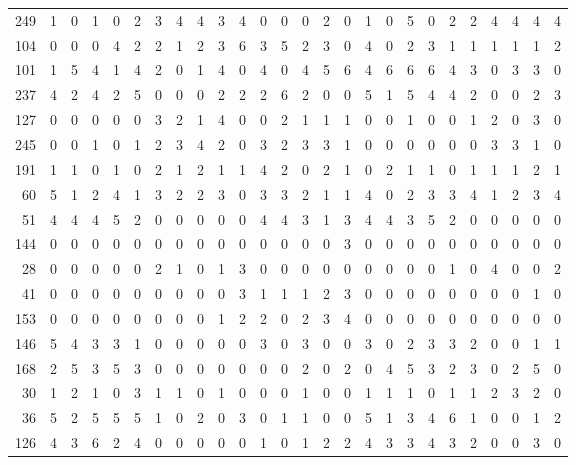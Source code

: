 \begin{longtable}{@{\extracolsep{\fill}}rccccccccccccccccccccccccc@{}}
249 & 1 & 0 & 1 & 0 & 2 & 3 & 4 & 4 & 3 & 4 & 0 & 0 & 0 & 2 & 0 & 1 & 0 & 5 & 0 & 2 & 2 & 4 & 4 & 4 & 4 \\
104 & 0 & 0 & 0 & 4 & 2 & 2 & 1 & 2 & 3 & 6 & 3 & 5 & 2 & 3 & 0 & 4 & 0 & 2 & 3 & 1 & 1 & 1 & 1 & 1 & 2 \\
101 & 1 & 5 & 4 & 1 & 4 & 2 & 0 & 1 & 4 & 0 & 4 & 0 & 4 & 5 & 6 & 4 & 6 & 6 & 6 & 4 & 3 & 0 & 3 & 3 & 0 \\
237 & 4 & 2 & 4 & 2 & 5 & 0 & 0 & 0 & 2 & 2 & 2 & 6 & 2 & 0 & 0 & 5 & 1 & 5 & 4 & 4 & 2 & 0 & 0 & 2 & 3 \\
127 & 0 & 0 & 0 & 0 & 0 & 3 & 2 & 1 & 4 & 0 & 0 & 2 & 1 & 1 & 1 & 0 & 0 & 1 & 0 & 0 & 1 & 2 & 0 & 3 & 0 \\
245 & 0 & 0 & 1 & 0 & 1 & 2 & 3 & 4 & 2 & 0 & 3 & 2 & 3 & 3 & 1 & 0 & 0 & 0 & 0 & 0 & 0 & 3 & 3 & 1 & 0 \\
191 & 1 & 1 & 0 & 1 & 0 & 2 & 1 & 2 & 1 & 1 & 4 & 2 & 0 & 2 & 1 & 0 & 2 & 1 & 1 & 0 & 1 & 1 & 1 & 2 & 1 \\
60 & 5 & 1 & 2 & 4 & 1 & 3 & 2 & 2 & 3 & 0 & 3 & 3 & 2 & 1 & 1 & 4 & 0 & 2 & 3 & 3 & 4 & 1 & 2 & 3 & 4 \\
51 & 4 & 4 & 4 & 5 & 2 & 0 & 0 & 0 & 0 & 0 & 4 & 4 & 3 & 1 & 3 & 4 & 4 & 3 & 5 & 2 & 0 & 0 & 0 & 0 & 0 \\
144 & 0 & 0 & 0 & 0 & 0 & 0 & 0 & 0 & 0 & 0 & 0 & 0 & 0 & 0 & 3 & 0 & 0 & 0 & 0 & 0 & 0 & 0 & 0 & 0 & 0 \\
28 & 0 & 0 & 0 & 0 & 0 & 2 & 1 & 0 & 1 & 3 & 0 & 0 & 0 & 0 & 0 & 0 & 0 & 0 & 0 & 1 & 0 & 4 & 0 & 0 & 2 \\
41 & 0 & 0 & 0 & 0 & 0 & 0 & 0 & 0 & 0 & 3 & 1 & 1 & 1 & 2 & 3 & 0 & 0 & 0 & 0 & 0 & 0 & 0 & 0 & 1 & 0 \\
153 & 0 & 0 & 0 & 0 & 0 & 0 & 0 & 0 & 1 & 2 & 2 & 0 & 2 & 3 & 4 & 0 & 0 & 0 & 0 & 0 & 0 & 0 & 0 & 0 & 0 \\
146 & 5 & 4 & 3 & 3 & 1 & 0 & 0 & 0 & 0 & 0 & 3 & 0 & 3 & 0 & 0 & 3 & 0 & 2 & 3 & 3 & 2 & 0 & 0 & 1 & 1 \\
168 & 2 & 5 & 3 & 5 & 3 & 0 & 0 & 0 & 0 & 0 & 0 & 0 & 2 & 0 & 2 & 0 & 4 & 5 & 3 & 2 & 3 & 0 & 2 & 5 & 0 \\
30 & 1 & 2 & 1 & 0 & 3 & 1 & 1 & 0 & 1 & 0 & 0 & 0 & 1 & 0 & 0 & 1 & 1 & 1 & 0 & 1 & 1 & 2 & 3 & 2 & 0 \\
36 & 5 & 2 & 5 & 5 & 5 & 1 & 0 & 2 & 0 & 3 & 0 & 1 & 1 & 0 & 0 & 5 & 1 & 3 & 4 & 6 & 1 & 0 & 0 & 1 & 2 \\
126 & 4 & 3 & 6 & 2 & 4 & 0 & 0 & 0 & 0 & 0 & 1 & 0 & 1 & 2 & 2 & 4 & 3 & 3 & 4 & 3 & 2 & 0 & 0 & 3 & 0 \\

\end{longtable}
